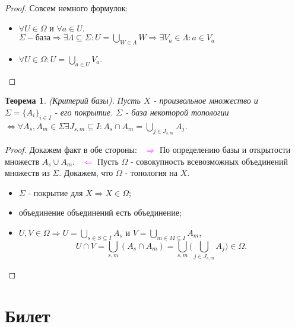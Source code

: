 \documentclass[a4paper,100pt]{article}
\theoremstyle{indented}
\newtheorem{theorem}{Теорема}
\begin{document}
\begin{proof} Совсем немного формулок: \

    \begin{itemize}
        \item $\forall U\in \Omega$ и $\forall a\in U$. \\
        $\Sigma - \text{база} \Rightarrow \exists \Lambda \subseteq \Sigma : U = \bigcup _{W\in \Lambda}W \Rightarrow \exists V_a \in \Lambda : a\in V_a$
        \item $\forall U \in \Omega : U = \bigcup_{a\in U}V_a$.
    \end{itemize}
\end{proof}

\begin{theorem}
    (\hypertarget{n17}{Критерий} базы). Пусть $X$ - произвольное множество и $\Sigma = \{ A_i \}_{i\in I}$ - его покрытие. $\Sigma$ - база некоторой топологии $\Longleftrightarrow \forall A_s, A_m \in \Sigma \exists J_{s, m}\subseteq I:A_s\cap A_m = \bigcup_{j\in J_{s, m}}A_j$.
\end{theorem}   

\begin{proof}
    Докажем факт в обе стороны: \ 
    \textcolor{magenta}{$\Rightarrow$} По определению базы и открытости множеств $A_s \cup A_m$. \ 
    \textcolor{magenta}{$\Leftarrow$} Пусть $\Omega$ - совокупность всевозможных объединений множеств из $\Sigma$. Докажем, что $\Omega $ - топология на $X$. \
    \begin{itemize}
        \item $\Sigma$ - покрытие для $X \Rightarrow X \in \Omega$;
        \item объединение объединений есть объединение;
        \item $U, V \in \Omega \Rightarrow U = \bigcup_{s\in S\subseteq I}A_s $ и $V = \bigcup_{m\in M\subseteq I} A_m$, 
        \[
            U\cap V = \bigcup_{s,m}(A_s\cap A_m) = \bigcup_{s,m}\biggl( \bigcup_{j\in J_{s,m}}A_j\biggr)\in \Omega.
        \]
    \end{itemize}

\end{proof}    

\section{Билет} \
\end{document}
